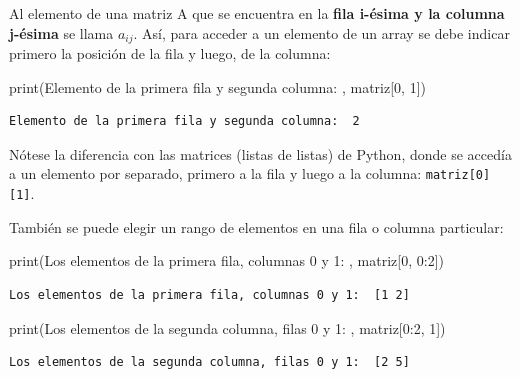 \documentclass[
  letterpaper,
  DIV=11,
  numbers=noendperiod]{scrreprt}
\newenvironment{Shaded}{\begin{snugshade}}{\end{snugshade}}
\newcommand{\BuiltInTok}[1]{\textcolor[rgb]{0.00,0.23,0.31}{#1}}
\newcommand{\DecValTok}[1]{\textcolor[rgb]{0.68,0.00,0.00}{#1}}
\newcommand{\NormalTok}[1]{\textcolor[rgb]{0.00,0.23,0.31}{#1}}
\newcommand{\StringTok}[1]{\textcolor[rgb]{0.13,0.47,0.30}{#1}}
\begin{document}
Al elemento de una matriz A que se encuentra en la \textbf{fila i-ésima
y la columna j-ésima} se llama \(a_{ij}\). Así, para acceder a un
elemento de un array se debe indicar primero la posición de la fila y
luego, de la columna:

\begin{Shaded}
\begin{Highlighting}[]
\BuiltInTok{print}\NormalTok{(}\StringTok{\textquotesingle{}Elemento de la primera fila y segunda columna: \textquotesingle{}}\NormalTok{, matriz[}\DecValTok{0}\NormalTok{, }\DecValTok{1}\NormalTok{])}
\end{Highlighting}
\end{Shaded}

\begin{verbatim}
Elemento de la primera fila y segunda columna:  2
\end{verbatim}

Nótese la diferencia con las matrices (listas de listas) de Python,
donde se accedía a un elemento por separado, primero a la fila y luego a
la columna: \texttt{matriz{[}0{]}{[}1{]}}.

También se puede elegir un rango de elementos en una fila o columna
particular:

\begin{Shaded}
\begin{Highlighting}[]
\BuiltInTok{print}\NormalTok{(}\StringTok{\textquotesingle{}Los elementos de la primera fila, columnas 0 y 1: \textquotesingle{}}\NormalTok{, matriz[}\DecValTok{0}\NormalTok{, }\DecValTok{0}\NormalTok{:}\DecValTok{2}\NormalTok{])}
\end{Highlighting}
\end{Shaded}

\begin{verbatim}
Los elementos de la primera fila, columnas 0 y 1:  [1 2]
\end{verbatim}

\begin{Shaded}
\begin{Highlighting}[]
\BuiltInTok{print}\NormalTok{(}\StringTok{\textquotesingle{}Los elementos de la segunda columna, filas 0 y 1: \textquotesingle{}}\NormalTok{, matriz[}\DecValTok{0}\NormalTok{:}\DecValTok{2}\NormalTok{, }\DecValTok{1}\NormalTok{])}
\end{Highlighting}
\end{Shaded}

\begin{verbatim}
Los elementos de la segunda columna, filas 0 y 1:  [2 5]
\end{verbatim}
\end{document}
